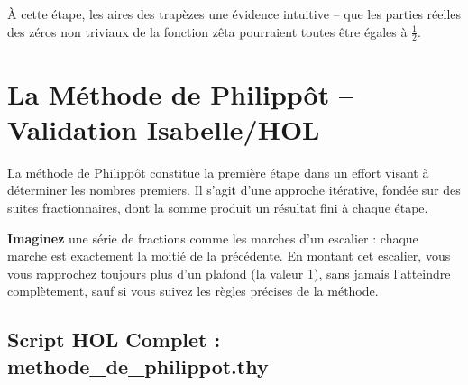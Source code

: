 \documentclass[a4paper,11pt]{article}
\newenvironment{resume}{%
    \begin{tcolorbox}[colback=purple!5,colframe=holpurple,title={\textbf{Résumé visuel}}]
}{%
    \end{tcolorbox}
}
\begin{document}
\begin{resume}
À cette étape, les aires des trapèzes une évidence intuitive -- que les parties réelles des zéros non triviaux de la fonction zêta pourraient toutes être égales à $\frac{1}{2}$.
\end{resume}

\newpage
\section{La Méthode de Philippôt -- Validation Isabelle/HOL}

La méthode de Philippôt constitue la première étape dans un effort visant à déterminer les nombres premiers. Il s'agit d'une approche itérative, fondée sur des suites fractionnaires, dont la somme produit un résultat fini à chaque étape.

\begin{resume}
\textbf{Imaginez} une série de fractions comme les marches d'un escalier : chaque marche est exactement la moitié de la précédente. En montant cet escalier, vous vous rapprochez toujours plus d'un plafond (la valeur 1), sans jamais l'atteindre complètement, sauf si vous suivez les règles précises de la méthode.
\end{resume}

\subsection{Script HOL Complet : methode\_de\_philippot.thy}
\end{document}
